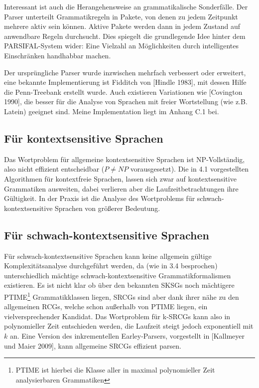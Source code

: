 \documentclass[12pt,a4paper]{article}
\theoremstyle{definition}
\begin{document}
			Interessant ist auch die Herangehensweise an grammatikalische Sonderfälle. Der Parser unterteilt Grammatikregeln in Pakete, von denen zu jedem Zeitpunkt mehrere aktiv sein können. Aktive Pakete werden dann in jedem Zustand auf anwendbare Regeln durchsucht. Dies spiegelt die grundlegende Idee hinter dem PARSIFAL-System wider: Eine Vielzahl an Möglichkeiten durch intelligentes Einschränken handhabbar machen.
		
			Der ursprüngliche Parser wurde inzwischen mehrfach verbessert oder erweitert, eine  bekannte Implementierung ist Fidditch von [Hindle 1983], mit dessen Hilfe die Penn-Treebank erstellt wurde. Auch existieren Variationen wie [Covington 1990], die besser für die Analyse von Sprachen mit freier Wortstellung (wie z.B. Latein) geeignet sind. Meine Implementation liegt im Anhang C.1 bei.

	\subsection{Für kontextsensitive Sprachen}
		Das Wortproblem für allgemeine kontextsensitive Sprachen ist NP-Vollständig, also nicht effizient entscheidbar ($P \neq NP$ vorausgesetzt). Die in 4.1 vorgestellten Algorithmen für kontextfreie Sprachen, lassen sich zwar auf kontextsensitive Grammatiken ausweiten, dabei verlieren aber die Laufzeitbetrachtungen ihre Gültigkeit. In der Praxis ist die Analyse des Wortproblems für schwach-kontextsensitive Sprachen von größerer Bedeutung.
	
	\subsection{Für schwach-kontextsensitive Sprachen}
		Für schwach-kontextsensitive Sprachen kann keine allgemein gültige Komplexitätsanalyse durchgeführt werden, da (wie in 3.4 besprochen) unterschiedlich mächtige schwach-kontextsensitive Grammatikformalismen existieren. Es ist nicht klar ob über den bekannten SKSGs noch mächtigere PTIME\footnote{PTIME ist hierbei die Klasse aller in maximal polynomieller Zeit analysierbaren Grammatiken} Grammatikklassen liegen, SRCGs sind aber dank ihrer nähe zu den allgemeinen RCGs, welche schon außerhalb von PTIME liegen, ein vielversprechender Kandidat. Das Wortproblem für k-SRCGs kann also in polynomieller Zeit entschieden werden, die Laufzeit steigt jedoch exponentiell mit $k$ an. Eine Version des inkrementellen Earley-Parsers, vorgestellt in [Kallmeyer und Maier 2009],  kann allgemeine SRCGs effizient parsen.
	
\end{document}
